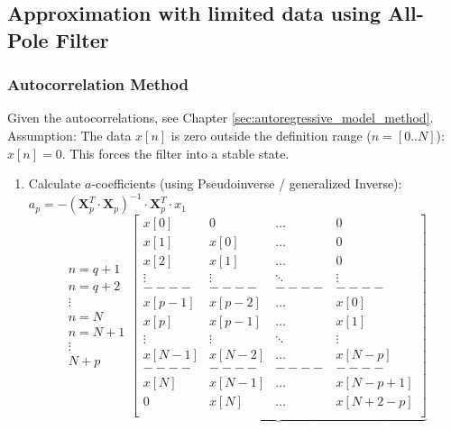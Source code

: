 		\subsection{Approximation with limited data using All-Pole Filter}
		\subsubsection{Autocorrelation Method }
		Given the autocorrelations, see Chapter \ref{sec:autoregressive_model_method}.\\
		Assumption: The data $x[n]$ is zero outside the definition range ($n=[0..N]$): $x[n]=0$. This forces the filter into a stable state.
		\renewcommand{\arraystretch}{1.0}
		
		\begin{enumerate}
			\item Calculate $a$-coefficients (using Pseudoinverse / generalized Inverse): $a_p = -\left(\bm X_p^T \cdot \bm  X_p\right)^{-1} \cdot \bm X_p^T \cdot x_1$
				   \small
					$$
				\begin{matrix} n=q+1\\ n=q+2\\ \vdots \\ n=N\\ n=N+1\\ \vdots \\ N+p
				\end{matrix}
				\underbrace{\begin{bmatrix}
					x[0] & 0 & \hdots & 0 \\ 
					x[1] & x[0] & \hdots & 0 \\ 
					x[2] & x[1] & \hdots & 0 \\        
					\vdots & \vdots & \ddots & \vdots \\
					----&----&----&----\\                
					x[p-1] & x[p-2] & \hdots & x[0] \\                                   
					x[p] & x[p-1] & \hdots & x[1] \\      
					\vdots & \vdots & \ddots & \vdots \\                        
					x[N-1] & x[N-2] & \hdots & x[N-p] \\ 
					----&----&----&----\\                            
					x[N] & x[N-1] & \hdots & x[N-p+1] \\ 
					0 & x[N] & \hdots & x[N+2-p] \\

\end{bmatrix}}$$
\end{enumerate}
